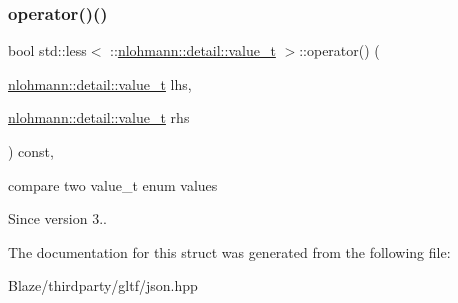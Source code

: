 \subsubsection{\texorpdfstring{operator()()}{operator()()}}
{\footnotesize\ttfamily bool std\+::less$<$ \+::\hyperlink{namespacenlohmann_1_1detail_a1ed8fc6239da25abcaf681d30ace4985}{nlohmann\+::detail\+::value\+\_\+t} $>$\+::operator() (\begin{DoxyParamCaption}\item[{\hyperlink{namespacenlohmann_1_1detail_a1ed8fc6239da25abcaf681d30ace4985}{nlohmann\+::detail\+::value\+\_\+t}}]{lhs,  }\item[{\hyperlink{namespacenlohmann_1_1detail_a1ed8fc6239da25abcaf681d30ace4985}{nlohmann\+::detail\+::value\+\_\+t}}]{rhs }\end{DoxyParamCaption}) const\hspace{0.3cm}{\ttfamily [inline]}, {\ttfamily [noexcept]}}



compare two value\+\_\+t enum values 

\begin{DoxySince}{Since}
version 3.. 
\end{DoxySince}


The documentation for this struct was generated from the following file\+:\begin{DoxyCompactItemize}
\item 
Blaze/thirdparty/gltf/json.\+hpp\end{DoxyCompactItemize}
